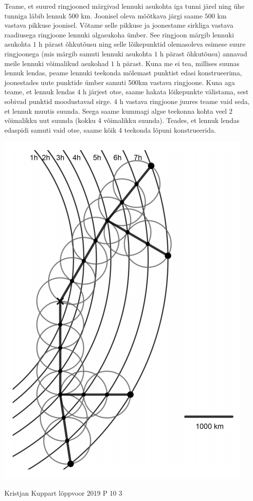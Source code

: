 \documentclass[11pt]{article}
\begin{document}
{{\ifSolution
Teame, et suured ringjooned märgivad lennuki asukohta iga tunni järel ning ühe tunniga läbib lennuk $500$ km. Joonisel oleva mõõtkava järgi saame $500$ km vastava pikkuse joonisel. Võtame selle pikkuse ja joonestame sirkliga vastava raadiusega ringjoone lennuki algasukoha ümber. See ringjoon märgib lennuki asukohta $1$ h pärast õhkutõusu ning selle lõikepunktid olemasoleva esimese suure ringjoonega (mis märgib samuti lennuki asukohta $1$ h pärast õhkutõusu) annavad meile lennuki võimalikud asukohad $1$ h pärast. Kuna me ei tea, millises suunas lennuk lendas, peame lennuki teekonda mõlemast punktist edasi konstrueerima, joonestades uute punktide ümber samuti 500km vastava ringjoone. Kuna aga teame, et lennuk lendas $4$ h järjest otse, saame hakata lõikepunkte välistama, sest sobivad punktid moodustavad sirge. $4$ h vastava ringjoone juures teame vaid seda, et lennuk muutis suunda. Seega saame kummagi algse teekonna kohta veel 2 võimalikku uut suunda (kokku 4 võimalikku suunda). Teades, et lennuk lendas edaspidi samuti vaid otse, saame kõik 4 teekonda lõpuni konstrueerida.
\begin{center}
	\includegraphics[width=0.5\linewidth]{2019-v3p-08-lah.PNG}
\end{center}
\fi
}
 


{Kristjan Kuppart} %
{lõppvoor} %
{2019} %
{P 10} %
{3} %
{

}}
\end{document}

